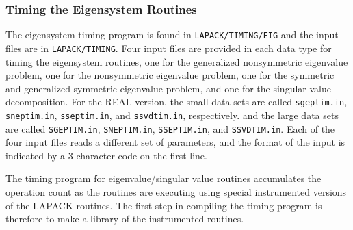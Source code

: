 \documentclass[11pt]{report}
\begin{document}
\subsubsection{Timing the Eigensystem Routines}\label{timeeig}

The eigensystem timing program is found in \texttt{LAPACK/TIMING/EIG}
and the input files are in \texttt{LAPACK/TIMING}.
Four input files are provided in each data type for timing the
eigensystem routines,
one for the generalized nonsymmetric eigenvalue problem, 
one for the nonsymmetric eigenvalue problem, 
one for the symmetric and generalized symmetric eigenvalue problem,
and one for the singular value decomposition.
For the REAL version, the small data sets are called \texttt{sgeptim.in},
\texttt{sneptim.in}, \texttt{sseptim.in}, and \texttt{ssvdtim.in}, respectively.
and the large data sets are called \texttt{SGEPTIM.in}, \texttt{SNEPTIM.in},
\texttt{SSEPTIM.in}, and \texttt{SSVDTIM.in}.
Each of the four input files reads a different set of parameters,
and the format of the input is indicated by a 3-character code
on the first line.

The timing program for eigenvalue/singular value routines accumulates
the operation count as the routines are executing using special
instrumented versions of the LAPACK routines.  The first step in
compiling the timing program is therefore to make a library of the
instrumented routines.
\end{document}
